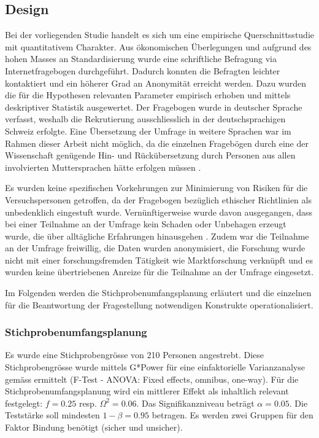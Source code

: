 \subsection{Design} \label{sec:Design}
Bei der vorliegenden Studie handelt es sich um eine empirische Querschnittsstudie mit quantitativem Charakter. Aus ökonomischen Überlegungen und aufgrund des hohen Masses an Standardisierung \cite[S.~86 ff.]{sedlmeier2008} wurde eine schriftliche Befragung via Internetfragebogen durchgeführt. Dadurch konnten die Befragten leichter kontaktiert und ein höherer Grad an Anonymität erreicht werden. Dazu wurden die für die Hypothesen relevanten Parameter empirisch erhoben und mittels deskriptiver Statistik ausgewertet. Der Fragebogen wurde in deutscher Sprache verfasst, weshalb die Rekrutierung ausschliesslich in der deutsch\-sprachigen Schweiz erfolgte. Eine Übersetzung der Umfrage in weitere Sprachen war im Rahmen dieser Arbeit nicht möglich, da die einzelnen Fragebögen durch eine der Wissenschaft genügende Hin- und Rückübersetzung durch Personen aus allen involvierten Muttersprachen hätte erfolgen müssen \cite{Pfetsch2016}.

Es wurden keine spezifischen Vorkehrungen zur Minimierung von Risiken für die Versuchspersonen getroffen, da der Fragebogen bezüglich ethischer Richtlinien als unbedenklich eingestuft wurde. Vernünftigerweise wurde davon ausgegangen, dass bei einer Teilnahme an der Umfrage kein Schaden oder Unbehagen erzeugt wurde, die über
alltägliche Erfahrungen hinausgehen \cite{DGP1998}. Zudem war die Teilnahme an der Umfrage freiwillig, die Daten wurden anonymisiert, die Forschung wurde nicht mit einer forschungsfremden Tätigkeit wie Marktforschung verknüpft und es wurden keine übertriebenen Anreize für die Teilnahme an der Umfrage eingesetzt.

Im Folgenden werden die Stichprobenumfangsplanung erläutert und die einzelnen für die Beantwortung der Fragestellung notwendigen Konstrukte operationalisiert.

\subsubsection{Stichprobenumfangsplanung}\label{sec:Stichprobenumfangsplanung}
Es wurde eine Stichprobengrösse von 210 Personen angestrebt. Diese Stichprobengrösse wurde mittels G*Power \cite{Faul2009} für eine einfaktorielle Varianzanalyse gemäss  ermittelt (F-Test - ANOVA: Fixed effects, omnibus, one-way).
Für die Stichprobenumfangsplanung wird ein mittlerer Effekt \cite{Cohen1988a} als inhaltlich relevant festgelegt: $f = 0.25$ resp. $\Omega^2 = 0.06$. Das Signifikanzniveau beträgt $\alpha=0.05$. Die Teststärke soll mindesten $1-\beta=0.95$ betragen. Es werden zwei Gruppen für den Faktor Bindung benötigt (sicher und unsicher).

